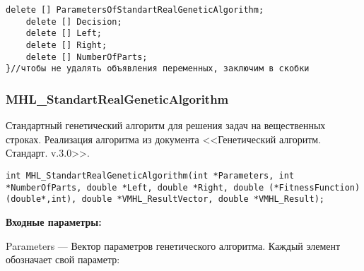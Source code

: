 \documentclass[a4paper,12pt]{article}
\begin{document}
\begin{lstlisting}[label=code_use_MHL_StandartGeneticAlgorithm,caption=Пример использования]
    delete [] ParametersOfStandartRealGeneticAlgorithm;
    delete [] Decision;
    delete [] Left;
    delete [] Right;
    delete [] NumberOfParts;
}//чтобы не удалять объявления переменных, заключим в скобки
\end{lstlisting}

\subsubsection{MHL\_StandartRealGeneticAlgorithm}\label{MHL_StandartRealGeneticAlgorithm}

Стандартный генетический алгоритм для решения задач на вещественных строках. Реализация алгоритма из документа <<Генетический алгоритм. Стандарт. v.3.0>>.


\begin{lstlisting}[label=code_syntax_MHL_StandartRealGeneticAlgorithm,caption=Синтаксис]
int MHL_StandartRealGeneticAlgorithm(int *Parameters, int *NumberOfParts, double *Left, double *Right, double (*FitnessFunction)(double*,int), double *VMHL_ResultVector, double *VMHL_Result);
\end{lstlisting}

\textbf{Входные параметры:}
 
Parameters --- Вектор параметров генетического алгоритма. Каждый элемент обозначает свой параметр:
 
\end{document}

